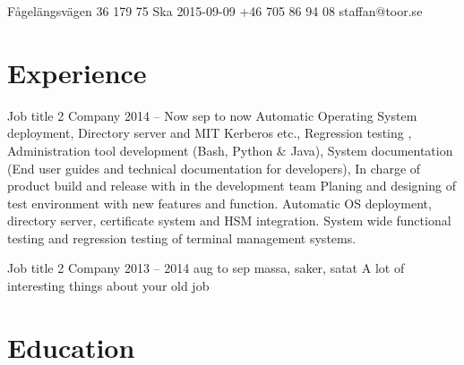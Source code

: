 \documentclass{sobCV}[2015/09/08]
\begin{document}

               {Fågelängsvägen 36}
               {179 75 Ska}
               {2015-09-09}
               {+46 705 86 94 08}
               {staffan@toor.se}




   \section{Experience}
   \experiencenode
      {Job title 2}                    %
      {Company}                        %
      {2014 -- Now}                    %
      {sep to now}{                    %
         Automatic Operating System deployment,
         Directory server and MIT Kerberos etc.,
         Regression testing ,
         Administration tool development (Bash, Python \& Java),
         System documentation (End user guides and technical documentation for developers),
         In charge of product build and release with in the development team
      }{
      Planing and designing of test environment with new features and function. Automatic OS deployment, directory server, certificate system and HSM integration. System wide functional testing and regression testing of terminal management systems.
   }

   \experiencenode
      {Job title 2}
      {Company}
      {2013 -- 2014}
      {aug to sep}
      {
         massa, saker, satat 
      }
      {
      A lot of interesting things about your old job
   }



   \section{Education}
\end{document}

